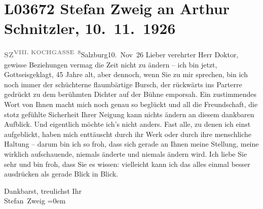 

\section[Stefan Zweig an Arthur Schnitzler, 10. 11. 1926]{L03672 Stefan Zweig an Arthur Schnitzler, 10. 11. 1926}
\nopagebreak{}
\rehead{ }\normalsize\beginnumbering{}
\toendnotes[C]{\smallbreak\pagebreak[2]}
\pstart
           {\pb}\textcolor{gray}{\textbf{SZ}}\hfill \substVorne{}\textsuperscript{\textcolor{gray}{\textbf{VIII.
                              KOCHGASSE 8}}}\substDazwischen{}Salzburg10. Nov 26\substHinten{}\pend
           \vspace{0.5em}
\pstart
           Lieber verehrter Herr Doktor, gewisse Beziehungen vermag die Zeit
               nicht zu ändern – ich bin jetzt, Gottseisgeklagt, 45 Jahre alt, aber dennoch, wenn
               Sie zu mir sprechen, bin ich noch immer der schüchterne flaumbärtige Bursch, der
               rückwärts ins Parterre gedrückt  zu dem berühmten
               Dichter auf der Bühne \introOben{}empor\introOben{}sah. Ein zustimmendes Wort von
               Ihnen macht mich noch genau so beglückt und all die Freundschaft, die stotz gefühlte
                  {\pb}Sicherheit Ihrer Neigung kann nichts
               ändern an diesem dankbaren Aufblick. Und eigentlich möchte ich’s nicht anders. Fast
               alle, zu denen ich einst aufgeblickt, haben mich enttäuscht durch ihr Werk oder durch
               ihre menschliche Haltung – darum bin ich so froh, dass sich gerade an Ihnen meine
               Stellung, meine wirklich aufschauende, niemals änderte und niemals ändern wird. Ich
               liebe Sie sehr und bin froh, dass Sie es wissen: vielleicht kann ich das alles einmal
               besser ausdrücken als gerade Blick in Blick.\pend
           
\pstart
           Dankbarst, treulichst Ihr{\\[\baselineskip]}\spacefill\mbox{Stefan Zweig}\pend
           \leftskip=0em{}\endnumbering{}
\begin{anhang}
\end{anhang}
      